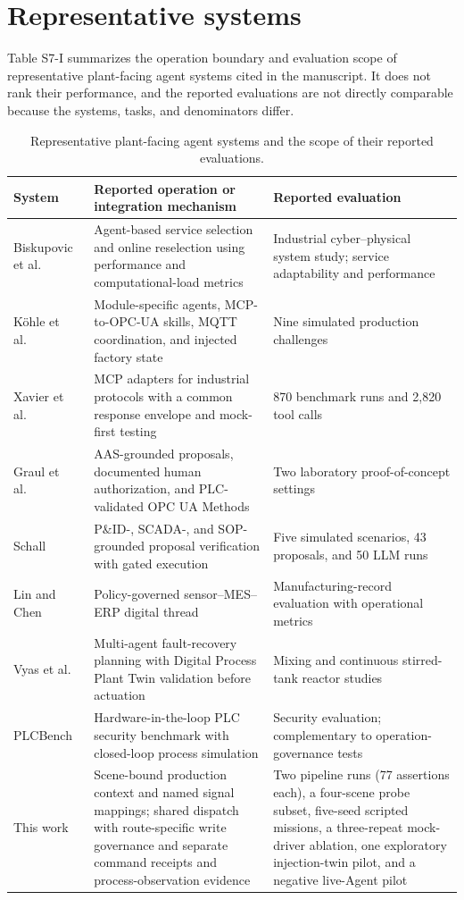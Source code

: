 \documentclass[10pt]{article}
\begin{document}
\section*{Representative systems}
Table S7-I summarizes the operation boundary and evaluation scope of representative plant-facing agent systems cited in the manuscript. It does not rank their performance, and the reported evaluations are not directly comparable because the systems, tasks, and denominators differ.

\begin{table}[h]
\centering
\caption{Representative plant-facing agent systems and the scope of their reported evaluations.}
\footnotesize
\setlength{\tabcolsep}{3pt}
\begin{tabularx}{\textwidth}{@{}>{\raggedright\arraybackslash}p{1.9cm}>{\raggedright\arraybackslash}p{6.2cm}X@{}}
\toprule
System & Reported operation or integration mechanism & Reported evaluation \\
\midrule
Biskupovic et al.~\cite{biskupovic2025supervision} & Agent-based service selection and online reselection using performance and computational-load metrics & Industrial cyber--physical system study; service adaptability and performance \\
K{\"o}hle et al.~\cite{koehle2026llmdriven} & Module-specific agents, MCP-to-OPC-UA skills, MQTT coordination, and injected factory state & Nine simulated production challenges \\
Xavier et al.~\cite{xavier2026industriConnect} & MCP adapters for industrial protocols with a common response envelope and mock-first testing & 870 benchmark runs and 2,820 tool calls \\
Graul et al.~\cite{graul2026aas} & AAS-grounded proposals, documented human authorization, and PLC-validated OPC UA Methods & Two laboratory proof-of-concept settings \\
Schall~\cite{schall2026safe} & P\&ID-, SCADA-, and SOP-grounded proposal verification with gated execution & Five simulated scenarios, 43 proposals, and 50 LLM runs \\
Lin and Chen~\cite{lin2026agentic} & Policy-governed sensor--MES--ERP digital thread & Manufacturing-record evaluation with operational metrics \\
Vyas et al.~\cite{vyas2026detection} & Multi-agent fault-recovery planning with Digital Process Plant Twin validation before actuation & Mixing and continuous stirred-tank reactor studies \\
PLCBench~\cite{zhou2026plcbench} & Hardware-in-the-loop PLC security benchmark with closed-loop process simulation & Security evaluation; complementary to operation-governance tests \\
This work & Scene-bound production context and named signal mappings; shared dispatch with route-specific write governance and separate command receipts and process-observation evidence & Two pipeline runs (77 assertions each), a four-scene probe subset, five-seed scripted missions, a three-repeat mock-driver ablation, one exploratory injection-twin pilot, and a negative live-Agent pilot \\
\bottomrule
\end{tabularx}
\end{table}
\end{document}
